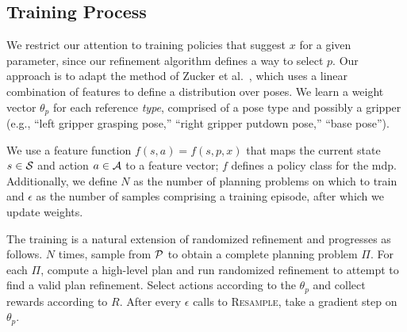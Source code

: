 
\subsection{Training Process}
We restrict our attention to training policies that suggest $x$ for a
given parameter, since our refinement algorithm defines a way to select
$p$. Our approach is to adapt the method of Zucker et
al.~\cite{workspacebias}, which uses a linear combination of features
to define a distribution over poses. We learn a weight vector
$\theta_{p}$ for each reference \emph{type}, comprised of a pose type
and possibly a gripper (e.g., ``left gripper grasping pose,'' ``right
gripper putdown pose,'' ``base pose'').

We use a feature function $f(s, a) = f(s, p, x)$ that maps the current
state $s \in \mathcal{S}$ and action $a \in \mathcal{A}$ to a feature vector; $f$
defines a policy class for the {\sc mdp}. Additionally, we define $N$
as the number of planning problems on which to train and $\epsilon$ as
the number of samples comprising a training episode, after which we
update weights.

The training is a natural extension of randomized refinement and
progresses as follows. $N$ times, sample from $\mathcal{P}$ to obtain a
complete planning problem $\Pi$. For each $\Pi$, compute a high-level plan
and run randomized refinement to attempt to find a valid
plan refinement. Select actions according to the $\theta_{p}$ and
collect rewards according to $R$. After every $\epsilon$ calls to
\textsc{Resample}, take a gradient step on $\theta_{p}$.

